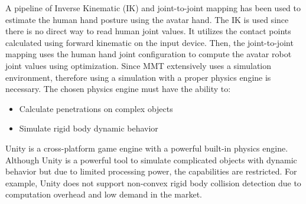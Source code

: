 \documentclass[letterpaper, 10 pt, conference]{ieeeconf}  %
\begin{document}
A pipeline of Inverse Kinematic (IK) \cite{aaron_adaptive_grasping} and joint-to-joint mapping has been used to estimate the human hand posture using the avatar hand.
The IK is used since there is no direct way to read human joint values. It utilizes the contact points calculated using forward kinematic on the input device. Then, the joint-to-joint mapping uses the human hand joint configuration to compute the avatar robot joint values using optimization.
 Since MMT extensively uses a simulation environment, therefore using a simulation with a proper physics engine is necessary. The chosen physics engine must have the ability to:
 \begin{itemize}
    \item Calculate penetrations on complex objects
    \item Simulate rigid body dynamic behavior
\end{itemize}
Unity is a cross-platform game engine with a powerful built-in physics engine. Although Unity is a powerful tool to simulate complicated objects with dynamic behavior but due to limited processing power, the capabilities are restricted. For example, Unity does not support non-convex rigid body collision detection due to computation overhead and low demand in the market. 
\end{document}
